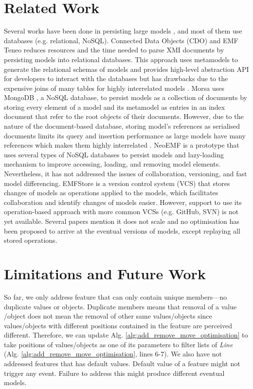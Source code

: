 \documentclass{llncs}
\begin{document}
\section{Related Work}
\label{sec:related_work}
Several works have been done in persisting large models , and most of them use databases (e.g. relational, NoSQL). Connected Data Objects (CDO) \cite{eclipse2017cdo} and EMF Teneo \cite{eclipse2017teneo} reduces resources and the time needed to parse XMI documents by persisting models into relational databases. This approach uses metamodels to generate the relational schemas of models and provides  high-level abstraction API for developers to interact with the databases but has drawbacks due to the expensive joins of many tables for highly interrelated models \cite{barmpis2014evaluation}.    
Morsa \cite{pagan2011morsa} uses MongoDB \cite{mongodb2017what}, a NoSQL database, to persist models as a collection of documents by storing every element of a model and its metamodel as entries in an index document that refer to the root objects of their documents. However, due to the nature of the document-based database, storing model's references as serialised documents limits its query and insertion performance as large models have many references which makes them highly interrelated \cite{barmpis2014evaluation}. NeoEMF \cite{daniel2016neoemf} is a prototype that uses several types of NoSQL databases to persist models and lazy-loading mechanism to improve accessing, loading, and removing model elements. Nevertheless, it has not addressed the issues of collaboration, versioning, and fast model differencing. EMFStore \cite{koegel2010emfstore} is a version control system (VCS) that stores changes of models as operations applied to the models, which facilitates collaboration and identify changes of models easier. However, support to use its operation-based approach with more common VCSs (e.g. GitHub, SVN) is not yet available. Several papers mention it does not scale \cite{pagan2011morsa,kolovos2013research} and no optimisation has been proposed to arrive at the eventual versions of models, except replaying all stored operations. 

\section{Limitations and Future Work}
\label{sec:limitations_and_future_work}
So far, we only address feature that can only contain unique members---no duplicate values or objects. Duplicate members means that removal of a value /object does not mean the removal of other same values/objects since values/objects with different positions contained in the feature are perceived different. Therefore, we can update Alg. \ref{alg:add_remove_move_optimisation} to take positions of values/objects as one of its parameters to filter lists of \emph{Line} (Alg. \ref{alg:add_remove_move_optimisation}, lines 6-7). We also have not addressed features that has default values. Default value of a feature might not trigger any event. Failure to address this might produce different eventual models. 
\end{document}
